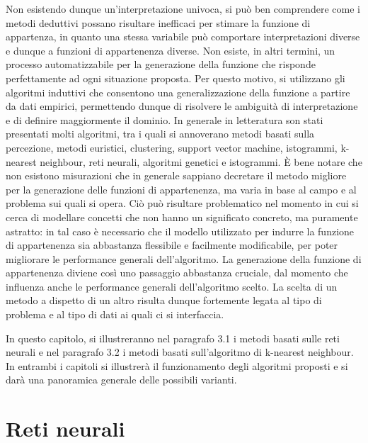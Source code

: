 \documentclass[11pt,  oneside, openany]{book}
\begin{document}
Non esistendo dunque un'interpretazione univoca, si può ben comprendere come i metodi deduttivi possano risultare inefficaci per stimare la funzione di appartenza, in quanto una stessa variabile può comportare interpretazioni diverse e dunque a funzioni di appartenenza diverse. Non esiste, in altri termini, un processo automatizzabile per la generazione della funzione che risponde perfettamente ad ogni situazione proposta. Per questo motivo, si utilizzano gli algoritmi induttivi che consentono una generalizzazione della funzione a partire da dati empirici, permettendo dunque di risolvere le ambiguità di interpretazione e di definire maggiormente il dominio. In generale in letteratura son stati presentati molti algoritmi, tra i quali si annoverano metodi basati sulla percezione, metodi euristici, clustering, support vector machine, istogrammi, k-nearest neighbour, reti neurali, algoritmi genetici e istogrammi. 
\`E bene notare che non esistono misurazioni che in generale sappiano decretare il metodo migliore per la generazione delle funzioni di appartenenza, ma varia in base al campo e al problema sui quali si opera. Ciò può risultare problematico nel momento in cui si cerca di modellare concetti che non hanno un significato concreto, ma puramente astratto: in tal caso è necessario che il modello utilizzato per indurre la funzione di appartenenza sia abbastanza flessibile e facilmente modificabile, per poter migliorare le performance generali dell'algoritmo. La generazione della funzione di appartenenza diviene così uno passaggio abbastanza cruciale, dal momento che influenza anche le performance generali dell'algoritmo scelto. La scelta di un metodo a dispetto di un altro risulta dunque fortemente legata al tipo di problema e al tipo di dati ai quali ci si interfaccia. 

In questo capitolo, si illustreranno nel paragrafo 3.1 i metodi basati sulle reti neurali e nel paragrafo 3.2 i metodi basati sull'algoritmo di k-nearest neighbour. In entrambi i capitoli si illustrerà il funzionamento degli algoritmi proposti e si darà una panoramica generale delle possibili varianti. 

\newpage

	\section{Reti neurali}
\end{document}
